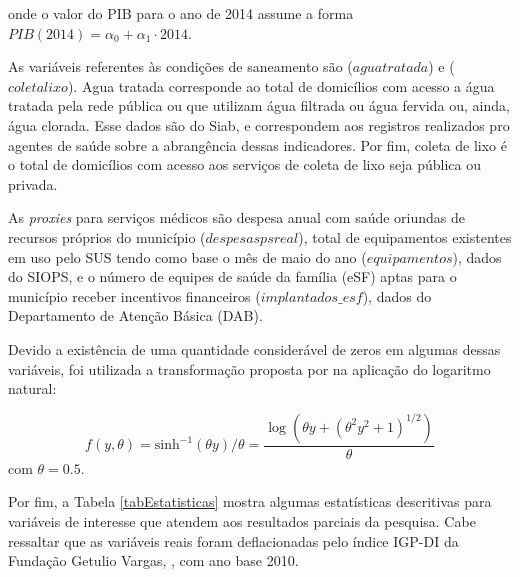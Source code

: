 \documentclass[twoside,onecolumn,12pt]{article}
\numberwithin{outputctr}{section}
\begin{document}

\noindent onde o valor do PIB para o ano de 2014 assume a forma $PIB(2014) = \alpha_0 + \alpha_1 \cdot 2014$.

As vari\'{a}veis referentes \`{a}s condi\c{c}\~{o}es de saneamento s\~{a}o ($aguatratada$) e ($coletalixo$). Agua tratada corresponde ao total de domicílios com acesso a \'{a}gua tratada pela rede p\'{u}blica ou que utilizam \'{a}gua filtrada  ou \'{a}gua fervida ou, ainda, \'{a}gua clorada. Esse dados são do Siab, e correspondem aos registros realizados pro agentes de saúde sobre a abrangência dessas indicadores. Por fim, coleta de lixo é o total de domicílios com acesso aos serviços de coleta de lixo seja pública ou privada.

As \textit{proxies} para serviços médicos são despesa anual com saúde oriundas de recursos próprios do município ($despesaspsreal$), total de equipamentos existentes em uso pelo SUS tendo como base o m\^{e}s de maio do ano ($equipamentos$), dados do SIOPS, e o n\'{u}mero de equipes de saúde da família (eSF) aptas para o munic\'{i}pio receber incentivos financeiros ($implantados\_esf$), dados do Departamento de Aten\c{c}\~{a}o B\'{a}sica (DAB). 

Devido a existência de uma quantidade consider\'{a}vel de zeros em algumas dessas vari\'{a}veis, foi utilizada a transformação proposta por  na aplicação do logaritmo natural:

\begin{equation}
 f(y,\theta) = \text{sinh}^{-1}(\theta y) / \theta = \frac{\log{( \theta y + (\theta^2 y^2 + 1)^{1/2} )}}{\theta}
 \label{eq_log_transform}
\end{equation}
\noindent com $\theta = 0.5$.

Por fim, a Tabela \ref{tabEstatisticas} mostra algumas estat\'{i}sticas descritivas para variáveis de interesse que atendem aos resultados parciais da pesquisa. Cabe ressaltar que as variáveis reais foram deflacionadas pelo índice IGP-DI da Fundação Getulio Vargas, , com ano base 2010.
\end{document}
